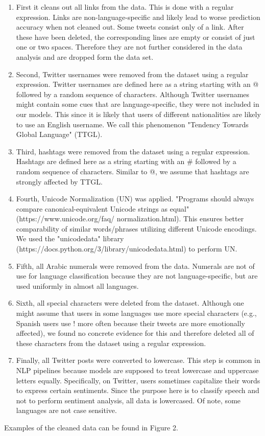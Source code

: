\documentclass[fleqn,10pt]{SelfArx} %
\begin{document}
\begin{enumerate}[noitemsep] 
	\item First it cleans out all links from the data. This is done with a regular expression. Links are non-language-specific and likely lead to worse prediction accuracy when not cleaned out. Some tweets consist only of a link. After these have been deleted, the corresponding lines are empty or consist of just one or two spaces. Therefore they are not further considered in the data analysis and are dropped form the data set. 
	\item Second, Twitter usernames were removed from the dataset using a regular expression. Twitter usernames are defined here as a string starting with an @ followed by a random sequence of characters. Although Twitter usernames might contain some cues that are language-specific, they were not included in our models. This since it is likely that users of different nationalities are likely to use an English username. We call this phenomenon "Tendency Towards Global Language" (TTGL). 
	\item Third, hashtags were removed from the dataset using a regular expression. Hashtags are defined here as a string starting with an \# followed by a random sequence of characters. Similar to @, we assume that hashtags are strongly affected by TTGL. 
	\item Fourth, Unicode Normalization (UN) was applied. "Programs should always compare canonical-equivalent Unicode strings as equal" (https://www.unicode.org/faq/ \newline normalization.html). This ensures better comparability of similar words/phrases utilizing different Unicode encodings. We used the "unicodedata" library (https://docs.python.org/3/library/unicodedata.html) to perform UN.
	\item Fifth, all Arabic numerals were removed from the data. Numerals are not of use for language classification because they are not language-specific, but are used uniformly in almost all languages. 
	\item Sixth, all special characters were deleted from the dataset. Although one might assume that users in some languages use more special characters (e.g., Spanish users use ! more often because their tweets are more emotionally affected), we found no concrete evidence for this and therefore deleted all of these characters from the dataset using a regular expression.
	\item Finally, all Twitter posts were converted to lowercase. This step is common in NLP pipelines because models are supposed to treat lowercase and uppercase letters equally. Specifically, on Twitter, users sometimes capitalize their words to express certain sentiments. Since the purpose here is to classify speech and not to perform sentiment analysis, all data is lowercased. Of note, some languages are not case sensitive. 
\end{enumerate}
Examples of the cleaned data can be found in Figure 2.
\end{document}
